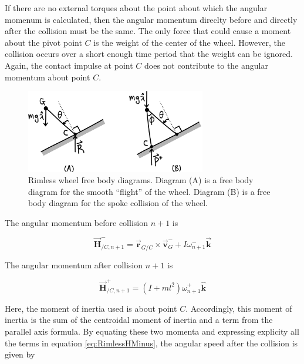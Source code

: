 If there are no external torques about the point about which the angular momenum is calculated, then the angular momentum direclty before and directly after the collision must be the same. The only force that could cause a moment about the pivot point $C$ is the weight of the center of the wheel. However, the collision occurs over a short enough time period that the weight can be ignored. Again, the contact impulse at point $C$ does not contribute to the angular momentum about point $C$.

\begin{figure}[h]		%
\begin{centering}
\includegraphics[width=0.7\textwidth]{Figures/RimlessSmoothAndCollision}\par
\end{centering}
\caption[Diagram: Rimless Wheel Free Body Diagrams]{Rimless wheel free body diagrams. Diagram (A) is a free body diagram for the smooth ``flight'' of the wheel. Diagram (B) is a free body diagram for the spoke collision of the wheel.}
\label{fig:RimlessSmoothAndCollision}
\end{figure}
%

The angular momentum before collision $n+1$ is

\begin{equation}
\vec{\mathbf{H}}_{/C,n+1}^{-} = \vec{\mathbf{r}}_{G/C} \times \vec{\mathbf{v}}_{G}^{-} + I \omega_{n+1}^{-} \vec{\mathbf{k}}
\label{eq:RimlessHMinus}
\end{equation}

The angular momentum after collision $n+1$ is

\begin{equation}
\vec{\mathbf{H}}_{/C,n+1}^{+} = (I + ml^{2} ) \omega_{n+1}^{+} \hat{\mathbf{k}}
\label{eq:RimlessHPlus}
\end{equation}

Here, the moment of inertia used is about point $C$. Accordingly, this moment of inertia is the sum of the centroidal moment of inertia and a term from the parallel axis formula. By equating these two momenta and expressing explicity all the terms in equation \ref{eq:RimlessHMinus}, the angular speed after the collision is given by

